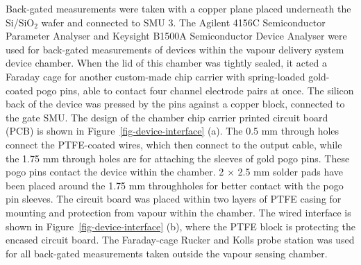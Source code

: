 \documentclass[
  a4paper,
]{scrbook}
\begin{document}
Back-gated measurements were taken with a copper plane placed underneath
the Si/SiO\(_2\) wafer and connected to SMU 3. The Agilent 4156C
Semiconductor Parameter Analyser and Keysight B1500A Semiconductor
Device Analyser were used for back-gated measurements of devices within
the vapour delivery system device chamber. When the lid of this chamber
was tightly sealed, it acted a Faraday cage for another custom-made chip
carrier with spring-loaded gold-coated pogo pins, able to contact four
channel electrode pairs at once. The silicon back of the device was
pressed by the pins against a copper block, connected to the gate SMU.
The design of the chamber chip carrier printed circuit board (PCB) is
shown in Figure~\ref{fig-device-interface} (a). The 0.5 mm through holes
connect the PTFE-coated wires, which then connect to the output cable,
while the 1.75 mm through holes are for attaching the sleeves of gold
pogo pins. These pogo pins contact the device within the chamber. 2 ×
2.5 mm solder pads have been placed around the 1.75 mm throughholes for
better contact with the pogo pin sleeves. The circuit board was placed
within two layers of PTFE casing for mounting and protection from vapour
within the chamber. The wired interface is shown in
Figure~\ref{fig-device-interface} (b), where the PTFE block is
protecting the encased circuit board. The Faraday-cage Rucker and Kolls
probe station was used for all back-gated measurements taken outside the
vapour sensing chamber.
\end{document}
